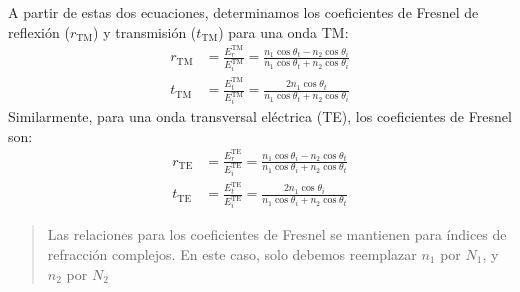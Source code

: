 \documentclass[letterpaper,10pt,english]{jupyterBook}
\begin{document}
\sphinxAtStartPar
A partir de estas dos ecuaciones, determinamos los coeficientes de Fresnel de reflexión (\(r_\mathrm{TM}\)) y transmisión (\(t_\mathrm{TM}\)) para una onda TM:
\label{equation:2_ondas_EM_en_la_materia/2_ondas_EM_en_la_materia:540b24d3-434c-4c97-944a-35086df54b0c}\begin{align}
r_\mathrm{TM} &= \frac{E_r^\mathrm{TM}}{E_i^\mathrm{TM}} = \frac{n_1\cos\theta_t-n_2\cos\theta_i}
{n_1\cos\theta_t+n_2\cos\theta_i}
\\[10pt]
t_\mathrm{TM} &= \frac{E_t^\mathrm{TM}}{E_i^\mathrm{TM}} =\frac{2n_1\cos\theta_t}
{n_1\cos\theta_t+n_2\cos\theta_i}
\end{align}
\sphinxAtStartPar
Similarmente, para una onda transversal eléctrica (TE), los coeficientes de Fresnel son:
\label{equation:2_ondas_EM_en_la_materia/2_ondas_EM_en_la_materia:5bfc37a8-ff0e-4203-8c82-3c9ea1a7b061}\begin{align}
r_\mathrm{TE} &= \frac{E_r^\mathrm{TE}}{E_i^\mathrm{TE}} = \frac{n_1\cos\theta_i -n_2\cos\theta_t}
{n_1\cos\theta_i+n_2\cos\theta_t}
\\[10pt]
t_\mathrm{TE} &= \frac{E_t^\mathrm{TE}}{E_i^\mathrm{TE}} = \frac{2n_1\cos\theta_i}
{n_1\cos\theta_i+n_2\cos\theta_t}
\end{align}\begin{quote}

\sphinxAtStartPar
Las relaciones para los coeficientes de Fresnel se mantienen para índices de refracción complejos. En este caso, solo debemos reemplazar \(n_1\) por \(N_1\), y \(n_2\) por \(N_2\)
\end{quote}
\end{document}
